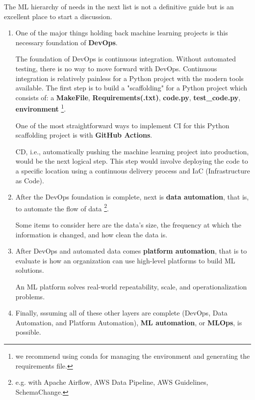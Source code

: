 The ML hierarchy of needs in the next list is not a definitive guide
but is an excellent place to start a discussion.
\begin{enumerate}
    \item One of the major things holding back machine learning
    projects is this necessary foundation of \textbf{DevOps}.

    The foundation of DevOps is continuous integration. Without
    automated testing, there is no way to move forward with DevOps.
    Continuous integration is relatively painless for a Python
    project with the modern tools available. The first step is to
    build a "scaffolding" for a Python project which consists of:
    a \textbf{MakeFile}, \textbf{Requirements(.txt)},
    \textbf{code.py},  \textbf{test\_code.py}, \textbf{environment}
    \footnote{
        we recommend using conda for managing the environment and
        generating the requirements file.
    }.

    One of the most straightforward ways to implement CI for this
    Python scaffolding project is with \textbf{GitHub Actions}.

    CD, i.e., automatically pushing the machine learning project
    into production, would be the next logical step. This step
    would involve deploying the code to a specific location using
    a continuous delivery process and IaC (Infrastructure as Code).


    \item After the DevOps foundation is complete, next is
    \textbf{data automation}, that is, to automate the flow of data
    \footnote{
        e.g. with Apache Airflow, AWS Data Pipeline, AWS Guidelines,
        SchemaChange.
    }.

    Some items to consider here are the data's size, the frequency
    at which the information is changed, and how clean the data is.


    \item After DevOps and automated data comes
    \textbf{platform automation}, that is to evaluate is how an
    organization can use high-level platforms to build ML solutions.
    
    An ML platform solves real-world repeatability, scale, and
    operationalization problems.


    \item Finally, sssuming all of these other layers are complete
    (DevOps, Data Automation, and Platform Automation),
    \textbf{ML automation}, or \textbf{MLOps}, is possible.


\end{enumerate}
